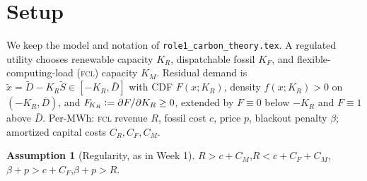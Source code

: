 \documentclass[11pt,reqno]{amsart}
\theoremstyle{plain}
\theoremstyle{definition}
\newtheorem{assumption}{Assumption}
\theoremstyle{remark}
\newcommand{\KR}{K_R}
\newcommand{\KF}{K_F}
\newcommand{\KM}{K_M}
\newcommand{\KRs}{K_R^{*}}
\newcommand{\KRo}{K_R^{\circ}}
\newcommand{\Dbar}{\bar D}
\newcommand{\CM}{C_M}
\newcommand{\CF}{C_F}
\newcommand{\CR}{C_R}
\newcommand{\bp}{\beta+p}
\newcommand{\FKR}{F_{\!\KR}}
\newcommand{\eqdef}{\vcentcolon=}
\begin{document}
\begin{abstract}
$\operatorname{sign}\Delta$ and Week-1's conjecture admits no proof from the
distribution-free structure alone. The residual
question is then the sign of a cutoff-computable benchmark $\Delta_0$ plus a density
tilt; numerically, at every large-\textsc{fcl} interior optimum scanned $\Delta_0<0$
($\Delta_0^{\max}\approx-1.09$) and the tilt reinforces it, $\Delta<0$
($\Delta^{\max}\approx-1.40$). Carbon strictly
falls only in the cheap-renewable corner $\KRs\to\infty$. So the honest reading is
\emph{negative}: interior carbon reduction is a corner phenomenon (the
small-\textsc{fcl} regime is Role~4's, not claimed here). \emph{Four}, the carbon-reduction set
$\{\CR:\Delta(\CR)\ge0\}$ is bounded above and non-empty---its non-emptiness
coming from that power-law corner, not from an interior optimum---and is a single
interval under an explicit monotone-renewable-shadow-value condition that, we note,
already encodes the single-crossing property it certifies.
\emph{Five}, the sharp necessary-and-sufficient condition for $\KRs>\KRo$ is the
\emph{path integral} of the realized endpoint gap; pointwise-monotone $g$ is
sufficient but not necessary; and the two-sided bounds on the carbon saving are
tight, attained by explicit degenerate conditional laws. Every identity is checked
against quadrature of the profit integral in \texttt{verify\_week2.py}.
\end{abstract}

\maketitle

\section{Setup}\label{sec:setup}

We keep the model and notation of \texttt{role1\_carbon\_theory.tex}. A regulated
utility chooses renewable capacity $\KR$, dispatchable fossil $\KF$, and
flexible-computing-load (\textsc{fcl}) capacity $\KM$. Residual demand is
$\tilde x=\tilde D-\KR\tilde S\in[-\KR,\Dbar]$ with CDF $F(x;\KR)$, density
$f(x;\KR)>0$ on $(-\KR,\Dbar)$, and $\FKR\eqdef\partial F/\partial\KR\ge0$,
extended by $F\equiv0$ below $-\KR$ and $F\equiv1$ above $\Dbar$. Per-MWh:
\textsc{fcl} revenue $R$, fossil cost $c$, price $p$, blackout penalty $\beta$;
amortized capital costs $\CR,\CF,\CM$.

\begin{assumption}[Regularity, as in Week 1]\label{ass:reg}
$R>c+\CM$,\quad $R<c+\CF+\CM$,\quad $\bp>c+\CF$,\quad $\bp>R$.
\end{assumption}
\end{document}
